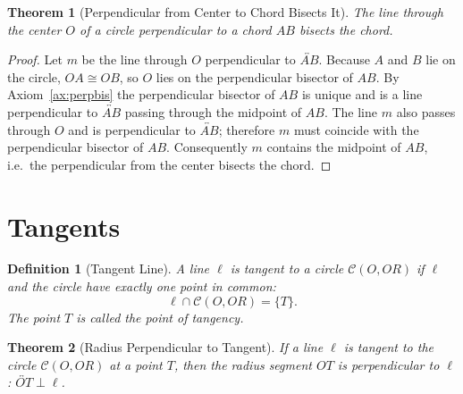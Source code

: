 \documentclass[12pt]{article}
\newtheorem{theorem}{Theorem}[section]
\newtheorem{definition}{Definition}[section]
\newcommand{\congsegment}{\cong}
\begin{document}
\begin{theorem}[Perpendicular from Center to Chord Bisects It]\label{thm:perp-bisect}
The line through the center $O$ of a circle perpendicular to a chord $AB$ bisects the chord.
\end{theorem}

\begin{proof}
Let $m$ be the line through $O$ perpendicular to $\overleftrightarrow{AB}$. Because $A$ and $B$ lie on the circle, $OA\congsegment OB$, so $O$ lies on the perpendicular bisector of $AB$. By Axiom~\ref{ax:perpbis} the perpendicular bisector of $AB$ is unique and is a line perpendicular to $\overleftrightarrow{AB}$ passing through the midpoint of $AB$. The line $m$ also passes through $O$ and is perpendicular to $\overleftrightarrow{AB}$; therefore $m$ must coincide with the perpendicular bisector of $AB$. Consequently $m$ contains the midpoint of $AB$, i.e.\ the perpendicular from the center bisects the chord.
\end{proof}

\section{Tangents}

\begin{definition}[Tangent Line]\label{def:tangent}
A line $\ell$ is \emph{tangent} to a circle $\mathcal{C}(O,OR)$ if $\ell$ and the circle have exactly one point in common:
\[
\ell \cap \mathcal{C}(O,OR) = \{T\}.
\]
The point $T$ is called the \emph{point of tangency}.
\end{definition}

\begin{theorem}[Radius Perpendicular to Tangent]\label{thm:tangent-perp}
If a line $\ell$ is tangent to the circle $\mathcal{C}(O,OR)$ at a point $T$, then the radius segment $OT$ is perpendicular to $\ell$:  $\overleftrightarrow{OT} \perp \ell$.
\end{theorem}
\end{document}
